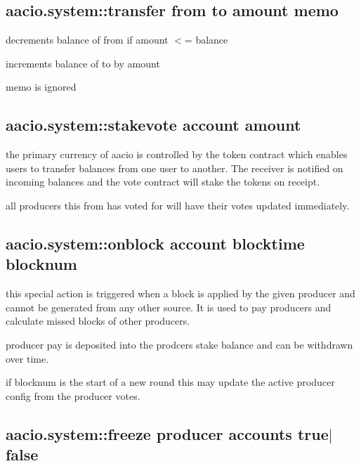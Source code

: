 \subsection*{aacio.\+system\+::transfer from to amount memo}


\begin{DoxyItemize}
\item decrements balance of from if amount $<$= balance
\item increments balance of to by amount
\item memo is ignored
\end{DoxyItemize}

\subsection*{aacio.\+system\+::stakevote account amount}


\begin{DoxyItemize}
\item the primary currency of aacio is controlled by the token contract which enables users to transfer balances from one user to another. The receiver is notified on incoming balances and the vote contract will stake the tokens on receipt.
\item all producers this \textquotesingle{}from\textquotesingle{} has voted for will have their votes updated immediately.
\end{DoxyItemize}

\subsection*{aacio.\+system\+::onblock account blocktime blocknum}


\begin{DoxyItemize}
\item this special action is triggered when a block is applied by the given producer and cannot be generated from any other source. It is used to pay producers and calculate missed blocks of other producers.
\item producer pay is deposited into the prodcer\textquotesingle{}s stake balance and can be withdrawn over time.
\item if blocknum is the start of a new round this may update the active producer config from the producer votes.
\end{DoxyItemize}

\subsection*{aacio.\+system\+::freeze producer accounts true$\vert$false}


